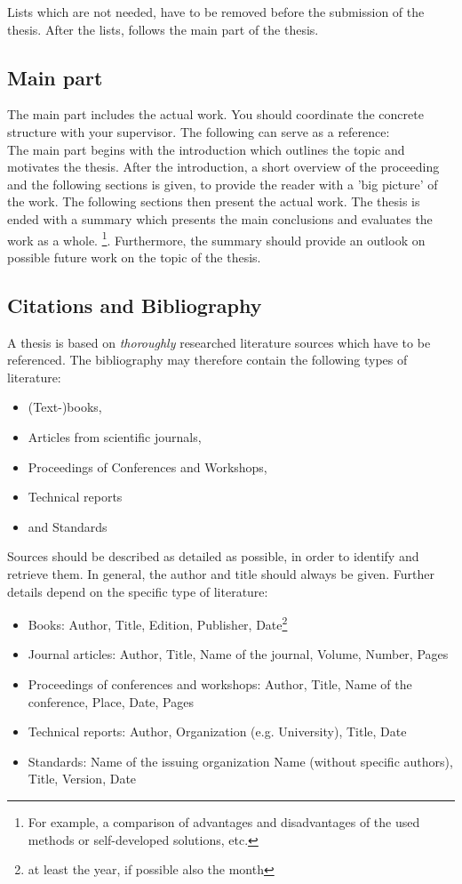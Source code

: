 Lists which are not needed, have to be removed before the submission of the thesis.
After the lists, follows the main part of the thesis.

\subsection{Main part}
The main part includes the actual work.
You should coordinate the concrete structure with your supervisor.
The following can serve as a reference:\\
The main part begins with the introduction which outlines the topic and motivates the thesis.
After the introduction, a short overview of the proceeding and the following sections is given, to provide the reader with a 'big picture' of the work.
The following sections then present the actual work.
The thesis is ended with a summary which presents the main conclusions and evaluates the work as a whole. \footnote{For example, a comparison of advantages and disadvantages of the used methods or self-developed solutions, etc.}. 
Furthermore, the summary should provide an outlook on possible future work on the topic of the thesis.

\subsection{Citations and Bibliography}

A thesis is based on \textit{thoroughly} researched literature sources which have to be referenced.
The bibliography may therefore contain the following types of literature:
\begin{itemize}
	\item (Text-)books,
	\item Articles from scientific journals,
	\item Proceedings of Conferences and Workshops,
	\item Technical reports
	\item and Standards
\end{itemize}

Sources should be described as detailed as possible, in order to identify and retrieve them.
In general, the author and title should always be given.
Further details depend on the specific type of literature: 

\begin{itemize}
	\item Books: Author, Title, Edition, Publisher, Date\footnote{at least the year, if possible also the month}
	\item Journal articles: Author, Title, Name of the journal, Volume, Number, Pages
	\item Proceedings of conferences and workshops: Author, Title, Name of the conference, Place, Date, Pages
	\item Technical reports: Author, Organization (e.g. University), Title, Date
	\item Standards: Name of the issuing organization Name (without specific authors), Title, Version, Date
\end{itemize}

